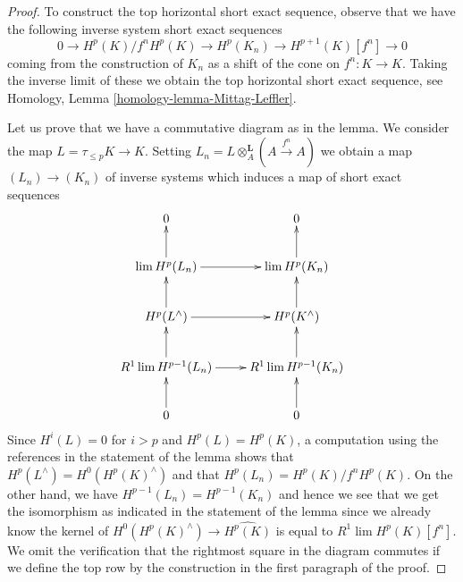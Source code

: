 \documentclass[10pt,a4paper]{amsart}
\theoremstyle{plain}
\theoremstyle{definition}
\theoremstyle{remark}
\numberwithin{equation}{subsection}
\def\lim{\mathop{\mathrm{lim}}\nolimits}
\begin{document}
\begin{proof}
To construct the top horizontal short exact sequence, observe that
we have the following inverse system short exact sequences
$$
0 \to H^p(K)/f^nH^p(K) \to H^p(K_n) \to H^{p + 1}(K)[f^n] \to 0
$$
coming from the construction of $K_n$ as a shift of the
cone on $f^n : K \to K$. Taking the inverse limit of these
we obtain the top horizontal short exact sequence, see
Homology, Lemma \ref{homology-lemma-Mittag-Leffler}.

\medskip\noindent
Let us prove that we have a commutative diagram as in the lemma.
We consider the map $L = \tau_{\leq p}K \to K$.
Setting $L_n = L \otimes_A^\mathbf{L} (A \xrightarrow{f^n} A)$
we obtain a map $(L_n) \to (K_n)$ of inverse systems which
induces a map of short exact sequences
$$
\xymatrix{
0 & 0 \\
\lim H^p(L_n) \ar[r] \ar[u] &
\lim H^p(K_n) \ar[u] \\
H^p(L^\wedge) \ar[r] \ar[u] &
H^p(K^\wedge) \ar[u] \\
R^1\lim H^{p - 1}(L_n) \ar[r] \ar[u] &
R^1\lim H^{p - 1}(K_n) \ar[u] \\
0 \ar[u] & 0 \ar[u]
}
$$
Since $H^i(L) = 0$ for $i > p$ and $H^p(L) = H^p(K)$,
a computation using the references in the statement of the lemma
shows that $H^p(L^\wedge) = H^0(H^p(K)^\wedge)$
and that $H^p(L_n) = H^p(K)/f^nH^p(K)$. On the other hand,
we have $H^{p - 1}(L_n) = H^{p - 1}(K_n)$ and hence we see that
we get the isomorphism as indicated in the statement of the lemma
since we already know the kernel of
$H^0(H^p(K)^\wedge) \to \widehat{H^p(K)}$ is equal
to $R^1\lim H^p(K)[f^n]$. We omit the verification
that the rightmost square in the diagram commutes if we
define the top row by the construction in the first paragraph
of the proof.
\end{proof}
\end{document}
